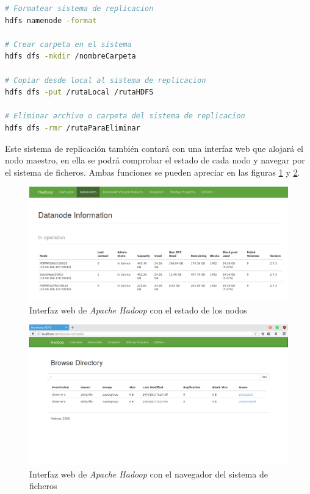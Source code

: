 \begin{lstlisting}[label=comandosHDFS,language=sh,frame=single,caption=Comandos \textit{Apache Hadoop}]
# Formatear sistema de replicacion
hdfs namenode -format

# Crear carpeta en el sistema
hdfs dfs -mkdir /nombreCarpeta

# Copiar desde local al sistema de replicacion
hdfs dfs -put /rutaLocal /rutaHDFS

# Eliminar archivo o carpeta del sistema de replicacion
hdfs dfs -rmr /rutaParaEliminar
\end{lstlisting}

Este sistema de replicación también contará con una interfaz web que alojará el nodo maestro, en ella se podrá comprobar el estado de cada nodo y navegar por el sistema de ficheros. Ambas funciones se pueden apreciar en las figuras \ref{fig:compHadoop} y \ref{fig:fichHadoop}.

\begin{figure}[htp!]
\centering
\caption{Interfaz web de \textit{Apache Hadoop} con el estado de los nodos}
\label{fig:compHadoop}
\includegraphics[scale=0.35]{graphics/hadoopDatanode}
\end{figure}

\begin{figure}[htp!]
\centering
\caption{Interfaz web de \textit{Apache Hadoop} con el navegador del sistema de ficheros}
\label{fig:fichHadoop}
\includegraphics[scale=0.35]{graphics/directorioHadoop}
\end{figure}

